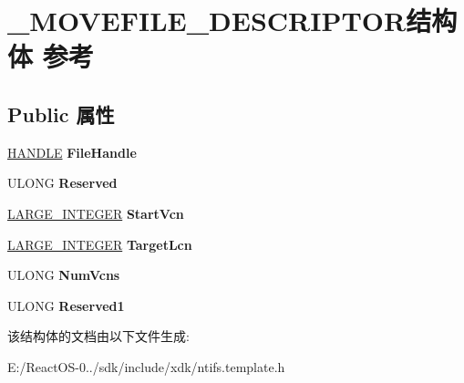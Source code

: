 \hypertarget{struct___m_o_v_e_f_i_l_e___d_e_s_c_r_i_p_t_o_r}{}\section{\+\_\+\+M\+O\+V\+E\+F\+I\+L\+E\+\_\+\+D\+E\+S\+C\+R\+I\+P\+T\+O\+R结构体 参考}
\label{struct___m_o_v_e_f_i_l_e___d_e_s_c_r_i_p_t_o_r}
\subsection*{Public 属性}
\begin{DoxyCompactItemize}
\item 
\mbox{\label{struct___m_o_v_e_f_i_l_e___d_e_s_c_r_i_p_t_o_r_ac3fc0f361c9d2ccd810a0cf17110b7e4}} 
\hyperlink{interfacevoid}{H\+A\+N\+D\+LE} {\bfseries File\+Handle}
\item 
\mbox{\label{struct___m_o_v_e_f_i_l_e___d_e_s_c_r_i_p_t_o_r_a4e292879d4bf4c8b71079cc24e4f9e38}} 
U\+L\+O\+NG {\bfseries Reserved}
\item 
\mbox{\label{struct___m_o_v_e_f_i_l_e___d_e_s_c_r_i_p_t_o_r_a93d55d98c74b6afd204ab2083ec9faca}} 
\hyperlink{union___l_a_r_g_e___i_n_t_e_g_e_r}{L\+A\+R\+G\+E\+\_\+\+I\+N\+T\+E\+G\+ER} {\bfseries Start\+Vcn}
\item 
\mbox{\label{struct___m_o_v_e_f_i_l_e___d_e_s_c_r_i_p_t_o_r_af97e68610923e53d9d1d81b184ca3c63}} 
\hyperlink{union___l_a_r_g_e___i_n_t_e_g_e_r}{L\+A\+R\+G\+E\+\_\+\+I\+N\+T\+E\+G\+ER} {\bfseries Target\+Lcn}
\item 
\mbox{\label{struct___m_o_v_e_f_i_l_e___d_e_s_c_r_i_p_t_o_r_acfc8c73703a89ac5106ca4f6d05f7a43}} 
U\+L\+O\+NG {\bfseries Num\+Vcns}
\item 
\mbox{\label{struct___m_o_v_e_f_i_l_e___d_e_s_c_r_i_p_t_o_r_a3a0975787f0240f3be6a0be509669994}} 
U\+L\+O\+NG {\bfseries Reserved1}
\end{DoxyCompactItemize}


该结构体的文档由以下文件生成\+:\begin{DoxyCompactItemize}
\item 
E\+:/\+React\+O\+S-\/0../sdk/include/xdk/ntifs.\+template.\+h\end{DoxyCompactItemize}
